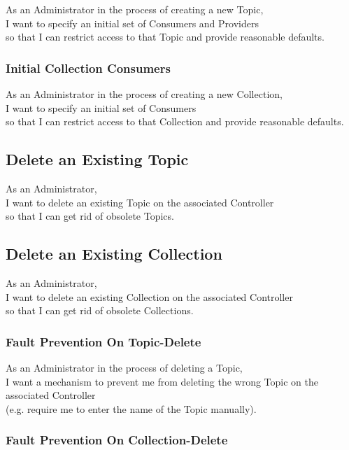 As an Administrator in the process of creating a new Topic,\\
I want to specify an initial set of Consumers and Providers \\
so that I can restrict access to that Topic and provide reasonable defaults.

\subsubsection{Initial Collection Consumers}\label{sec:requirement-initial-collection-consumer}

As an Administrator in the process of creating a new Collection,\\
I want to specify an initial set of Consumers \\
so that I can restrict access to that Collection and provide reasonable defaults.

\subsection{Delete an Existing Topic}\label{sec:delete-topic}

As an Administrator,\\
I want to delete an existing Topic on the associated Controller\\
so that I can get rid of obsolete Topics.

\subsection{Delete an Existing Collection}\label{sec:delete-collection}

As an Administrator,\\
I want to delete an existing Collection on the associated Controller\\
so that I can get rid of obsolete Collections.


\subsubsection{Fault Prevention On Topic-Delete}

As an Administrator in the process of deleting a Topic, \\
I want a mechanism to prevent me from deleting the wrong Topic on the associated Controller\\
(e.g. require me to enter the name of the Topic manually).

\subsubsection{Fault Prevention On Collection-Delete}

